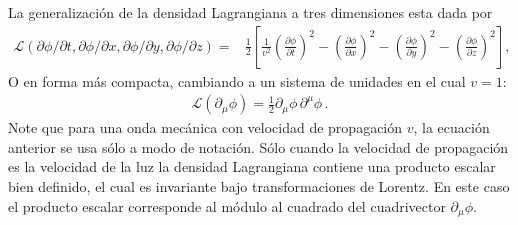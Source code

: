 \begin{frame}
La generalización de la densidad Lagrangiana a tres dimensiones esta dada por
\begin{align}
  \label{eq:dlc3d}
  \mathcal{L}(\partial\phi/\partial t,\partial\phi/\partial x,\partial\phi/\partial y,\partial\phi/\partial z)
=&\frac{1}{2}
\left[
  \frac{1}{v^2}\left(\frac{\partial\phi}{\partial t}\right)^2-\left(\frac{\partial\phi}{\partial x}\right)^2-\left(\frac{\partial\phi}{\partial y}\right)^2-\left(\frac{\partial\phi}{\partial z}\right)^2
\right],
\end{align}
O en forma más compacta, cambiando a un sistema de unidades en el cual $v=1$:
\begin{align}
  \mathcal{L}(\partial_{\mu} \phi)=  \frac{1}{2}{\partial_\mu\phi}\,{\partial^\mu\phi}\,.
\end{align}
Note que para una onda mecánica con velocidad de propagación $v$, la ecuación anterior se usa sólo a modo de notación. Sólo cuando la velocidad de propagación es la velocidad de la luz la densidad Lagrangiana contiene una producto escalar bien definido, el cual es invariante bajo transformaciones de Lorentz. En este caso el producto escalar corresponde al módulo al cuadrado del cuadrivector $\partial_{\mu}\phi$.
\end{frame}

